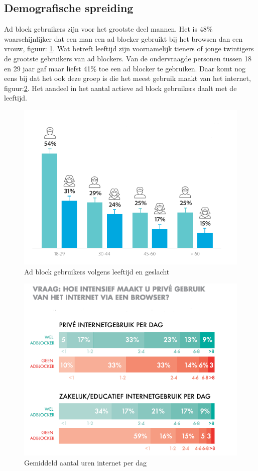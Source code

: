 \documentclass[pdftex,a4paper,12pt,twoside]{report}
\begin{document}
\subsection{Demografische spreiding}
\label{sec Demografische spreiding}
Ad block gebruikers zijn voor het grootste deel mannen. Het is 48\% waarschijnlijker dat een man een ad blocker gebruikt bij het browsen dan een vrouw, figuur: \ref{fig: Demographic_age_sex}. Wat betreft leeftijd zijn voornamelijk tieners of jonge twintigers de grootste gebruikers van ad blockers. Van de ondervraagde personen tussen 18 en 29 jaar gaf maar liefst 41\% toe een ad blocker te gebruiken. Daar komt nog eens bij dat het ook deze groep is die het meest gebruik maakt van het internet, figuur:\ref{fig: adbvsnadbHoursofIntertnet}. Het aandeel in het aantal actieve ad block gebruikers daalt met de leeftijd.

\begin{figure}[p]
\centering
\includegraphics[width=12cm]{img/demographicsMV}
\caption{Ad block gebruikers volgens leeftijd en geslacht}
\label{fig: Demographic_age_sex}
\end{figure}

\begin{figure}[p]
\centering
\includegraphics[width=12cm]{img/adbvsnadbHoursofIntertnet}
\caption{Gemiddeld aantal uren internet per dag }
\label{fig: adbvsnadbHoursofIntertnet}
\end{figure}
\end{document}
